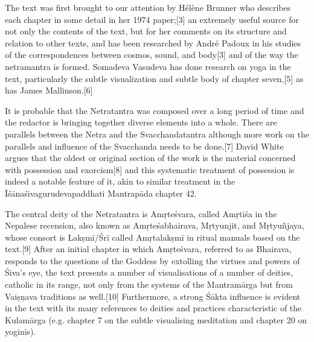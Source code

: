 The text was first brought to our attention by Hélène Brunner who describes each chapter in some detail in her 1974 paper;[3] an extremely useful source for not only the contents of the text, but for her comments on its structure and relation to other texts, and has been researched by André Padoux in his studies of the correspondences between cosmos, sound, and body[3] and of the way the netramantra is formed. Somadeva Vasudeva has done research on yoga in the text, particularly the subtle visualization and subtle body of chapter seven,[5] as has James Mallinson.[6]

It is probable that the Netratantra was composed over a long period of time and the redactor is bringing together diverse elements into a whole. There are parallels between the Netra and the Svacchandatantra although more work on the parallels and influence of the Svacchanda needs to be done.[7] David White argues that the oldest or original section of the work is the material concerned with possession and exorcism[8] and this systematic treatment of possession is indeed a notable feature of it, akin to similar treatment in the Īśānaśivagurudevapaddhati Mantrapāda chapter 42.

The central deity of the Netratantra is Amṛteśvara, called Amṛtīśa in the Nepalese recension, also known as Amṛteśabhairava, Mṛtyunjit, and Mṛtyuñjaya, whose consort is Lakṣmī/Śrī called Amṛtalakṣmī in ritual manuals based on the text.[9] After an initial chapter in which Amṛteśvara, referred to as Bhairava, responds to the questions of the Goddess by extolling the virtues and powers of Śiva’s eye, the text presents a number of visualisations of a number of deities, catholic in its range, not only from the systems of the Mantramārga but from Vaiṣṇava traditions as well.[10] Furthermore, a strong Śākta influence is evident in the text with its many references to deities and practices characteristic of the Kulamārga (e.g. chapter 7 on the subtle visualising meditation and chapter 20 on yoginīs).

